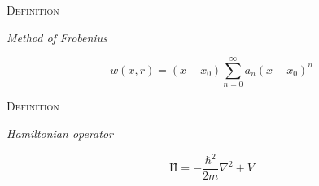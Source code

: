 \documentclass{article}
\newenvironment{flashcard}[2][]{%
\noindent  \textsc{#1}

\vfill
\centerline{{\Large\emph{#2}}}
\vfill
\newpage
}
{\newpage}
\begin{document}
\begin{flashcard}[Definition]{Method of Frobenius}

\begin{displaymath}
w(x,r)=(x-x_{0})\sum_{n=0}^{\infty}a_{n}(x-x_{0})^{n}
\end{displaymath}
\end{flashcard}

\begin{flashcard}[Definition]{Hamiltonian operator}
\begin{displaymath}
\textrm{\^H} = -\frac{\hbar^2}{2m}\nabla^2 + V
\end{displaymath} 
\end{flashcard}
\end{document}
